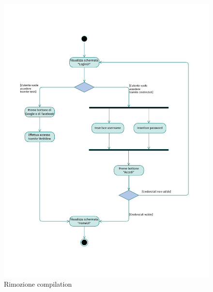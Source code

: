 \documentclass{natourDoc}
\begin{document}
\newpage
\begin{figure}[!htbp]
	\centering
	\includegraphics[width=\textwidth, page=9]{./diagrams/activity.pdf}
	\caption{Rimozione compilation}
\end{figure}
\FloatBarrier
\end{document}
